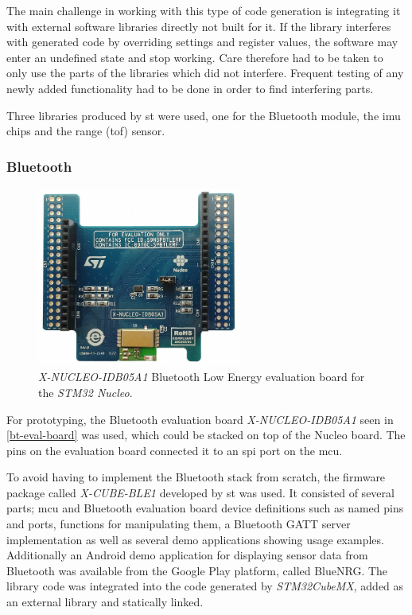 The main challenge in working with this type of code generation is integrating it with external software libraries directly not built for it. If the library interferes with generated code by overriding settings and register values, the software may enter an undefined state and stop working. Care therefore had to be taken to only use the parts of the libraries which did not interfere. Frequent testing of any newly added functionality had to be done in order to find interfering parts.

Three libraries produced by \gls{st} were used, one for the Bluetooth module, the \gls{imu} chips and the range (\gls{tof}) sensor.

\subsubsection{Bluetooth}\label{bluetooth}
\begin{figure}[H]
\centering
\includegraphics[width=0.6\textwidth]{Figures/x-nucleo-idb05a1.jpg}
\caption{\emph{X-NUCLEO-IDB05A1} Bluetooth Low Energy evaluation board for the \emph{STM32 Nucleo}.}
\label{bt-eval-board}
\end{figure}

For prototyping, the Bluetooth evaluation board \emph{X-NUCLEO-IDB05A1}\cite{x-nucleo-idb05a1} seen in \autoref{bt-eval-board} was used, which could be stacked on top of the Nucleo board. The pins on the evaluation board connected it to an \gls{spi} port on the \gls{mcu}.

To avoid having to implement the Bluetooth stack from scratch, the firmware package called \emph{X-CUBE-BLE1}\cite{x-cube-ble1} developed by \gls{st} was used. It consisted of several parts; \gls{mcu} and Bluetooth evaluation board device definitions such as named pins and ports, functions for manipulating them, a Bluetooth GATT server implementation as well as several demo applications showing usage examples. Additionally an Android demo application for displaying sensor data from Bluetooth was available from the Google Play platform, called BlueNRG\cite{bluenrg-app}. The library code was integrated into the code generated by \emph{STM32CubeMX}, added as an external library and statically linked.


